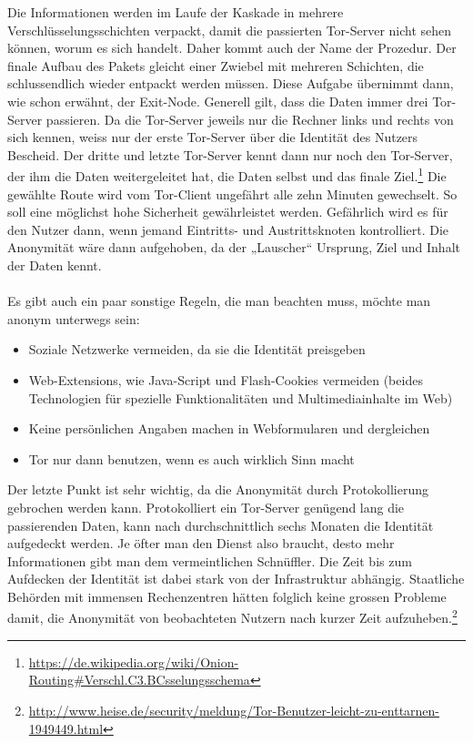 Die Informationen werden im Laufe der Kaskade in mehrere Verschlüsselungsschichten verpackt, damit die passierten Tor-Server nicht sehen können, worum es sich handelt. Daher kommt auch der Name der Prozedur. Der finale Aufbau des Pakets gleicht einer Zwiebel mit mehreren Schichten, die  schlussendlich wieder entpackt werden müssen. Diese Aufgabe übernimmt dann, wie schon erwähnt, der Exit-Node. Generell gilt, dass die Daten immer drei Tor-Server passieren. Da die Tor-Server jeweils nur die Rechner links und rechts von sich kennen, weiss nur der erste Tor-Server über die Identität des Nutzers Bescheid. Der dritte und letzte Tor-Server kennt dann nur noch den Tor-Server, der ihm die Daten weitergeleitet hat, die Daten selbst und das finale Ziel.\footnote{\url{https://de.wikipedia.org/wiki/Onion-Routing\#Verschl.C3.BCsselungsschema}}
Die gewählte Route wird vom Tor-Client ungefährt alle zehn Minuten gewechselt. So soll eine möglichst hohe Sicherheit gewährleistet werden. Gefährlich wird es für den Nutzer dann, wenn jemand Eintritts- und Austrittsknoten kontrolliert. Die Anonymität wäre dann aufgehoben, da der „Lauscher“ Ursprung, Ziel und Inhalt der Daten kennt.
\\
\\
Es gibt auch ein paar sonstige Regeln, die man beachten muss, möchte man anonym unterwegs sein:
\begin{itemize}
\item Soziale Netzwerke vermeiden, da sie die Identität preisgeben
\item Web-Extensions, wie Java-Script und Flash-Cookies vermeiden (beides Technologien für spezielle Funktionalitäten und Multimediainhalte im Web)
\item Keine persönlichen Angaben machen in Webformularen und dergleichen
\item Tor nur dann benutzen, wenn es auch wirklich Sinn macht
\end{itemize}

Der letzte Punkt ist sehr wichtig, da die Anonymität durch Protokollierung gebrochen werden kann. Protokolliert ein Tor-Server genügend lang die passierenden Daten, kann nach durchschnittlich sechs Monaten die Identität aufgedeckt werden. Je öfter man den Dienst also braucht, desto mehr Informationen gibt man dem vermeintlichen Schnüffler. Die Zeit bis zum Aufdecken der Identität ist dabei stark von der Infrastruktur abhängig. Staatliche Behörden mit immensen Rechenzentren hätten folglich keine grossen Probleme damit, die Anonymität von beobachteten Nutzern nach kurzer Zeit aufzuheben.\footnote{\url{http://www.heise.de/security/meldung/Tor-Benutzer-leicht-zu-enttarnen-1949449.html}}

